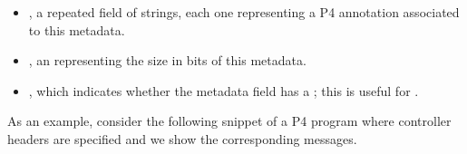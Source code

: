 \documentclass[11pt]{article}
\begin{document}
{\begin{itemize}
\begin{itemize}[noitemsep,topsep=\mdcompacttopsep]
\item{}, a repeated field of strings, each one representing a P4
annotation associated to this metadata.%

\item{}, an  representing the size in bits of this metadata.%

\item{}, which indicates whether the metadata field has a
; this is useful for
.%
\end{itemize}%
\end{itemize}%

\noindent{}As an example, consider the following snippet of a P4 program where controller
headers are specified and we show the corresponding 
messages.%

}
\end{document}
